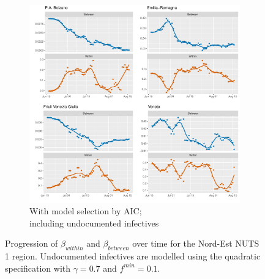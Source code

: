 \documentclass[12pt]{article}
\begin{document}
\begin{appendices}
\begin{figure}[H]
\begin{subfigure}{\textwidth}
    	      \includegraphics[width=\linewidth]{output/model_between_lag14_betas_Nord-Est_aic_UndocQuadratic_rolling.pdf}
    	      \caption{With model selection by AIC; \\ including undocumented infectives}
    	      \label{fig:beta_between_over_time_nordest_aic_undoc}
    	    \end{subfigure}
    	    \caption{Progression of $\beta_{within}$ and $\beta_{between}$ over time for the Nord-Est NUTS 1 region. Undocumented infectives are modelled using the quadratic specification with $\gamma = 0.7$ and $f^{min}=0.1$.}
    	    \label{fig:beta_between_over_time_nordest}
        \end{figure}
		

\end{appendices}
\end{document}
